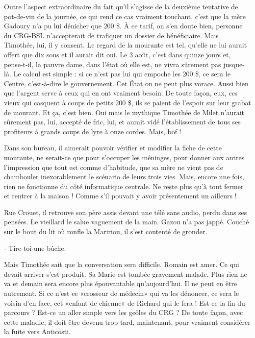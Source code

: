 Outre l’aspect extraordinaire du fait qu’il s’agisse de la deuxième tentative de pot-de-vin de la journée, ce qui rend ce cas vraiment touchant, c’est que la mère Gadoury n’a pu lui dénicher que 200 \$. À ce tarif, on s’en doute bien, personne du CRG-BSL n’accepterait de trafiquer un dossier de bénéficiaire. Mais Timothée, lui, il y consent. Le regard de la mourante est tel, qu’elle ne lui aurait offert que dix sous et il aurait dit oui. Le 3 août, c’est dans quinze jours et, pense-t-il, la pauvre dame, dans l’état où elle est, ne vivra sûrement pas jusque-là. Le calcul est simple : si ce n’est pas lui qui empoche les 200 \$, ce sera le Centre, c’est-à-dire le gouvernement. Cet État on ne peut plus vorace. Aussi bien que l’argent serve à ceux qui en ont vraiment besoin. De toute façon, eux, ces vieux qui casquent à coups de petits 200 \$, ils se paient de l’espoir sur leur grabat de mourant. Et ça, c’est bien. Oui mais le mythique Timothée de Milet n’aurait sûrement pas, lui, accepté de fric, lui, et aurait vidé l’établissement de tous ses profiteurs à grands coups de lyre à onze cordes. Mais, bof !

Dans son bureau, il aimerait pouvoir vérifier et modifier la fiche de cette mourante, ne serait-ce que pour s’occuper les méninges, pour donner aux autres l’impression que tout est comme d’habitude, que sa mère ne vient pas de chambouler inexorablement le scénario de leurs trois vies. Mais, encore une fois, rien ne fonctionne du côté informatique centrale. Ne reste plus qu’à tout fermer et rentrer à la maison ! Comme s’il pouvait y avoir présentement un ailleurs !

Rue Crouet, il retrouve son père assis devant une télé sans audio, perdu dans ses pensées. Le vieillard le salue vaguement de la main. Gazou n’a pas jappé. Couché sur le bout du lit où ronfle la Maririou, il s’est contenté de gronder.

- Tire-toi une bûche.

Mais Timothée sait que la conversation sera difficile. Romain est amer. Ce qui devait arriver s’est produit. Sa Marie est tombée gravement malade. Plus rien ne va et demain sera encore plus épouvantable qu’aujourd’hui. Il ne peut en être autrement. Si ce n’est ce «crosseur de médecin» qui va les dénoncer, ce sera le voisin d’en face, cet «enfant de chienne» de Richard qui le fera ! Est-ce la fin du parcours ? Est-ce un aller simple vers les geôles du CRG ? De toute façon, avec cette maladie, il doit être devenu trop tard, maintenant, pour vraiment considérer la fuite vers Anticosti.

